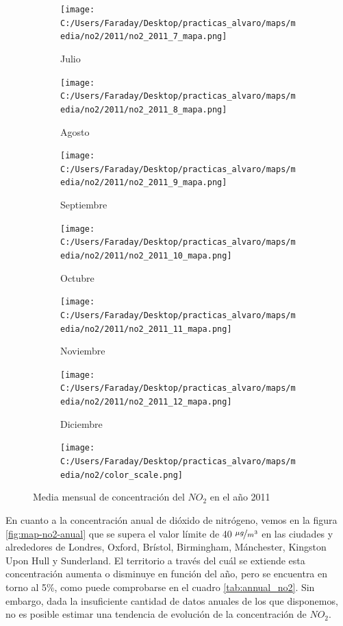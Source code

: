 \documentclass[12pt]{article}
\begin{document}
\begin{figure}[H]
\begin{subfigure}[H]{0.15\textwidth}
\texttt{[image: C:/Users/Faraday/Desktop/practicas\_alvaro/maps/media/no2/2011/no2\_2011\_7\_mapa.png]}
\captionsetup{labelformat=empty}
\caption{Julio}
\label{fig:map-no2-2011-7}
\end{subfigure}
%
\begin{subfigure}[H]{0.15\textwidth}
\texttt{[image: C:/Users/Faraday/Desktop/practicas\_alvaro/maps/media/no2/2011/no2\_2011\_8\_mapa.png]}
\captionsetup{labelformat=empty}
\caption{Agosto}
\label{fig:map-no2-2011-8}
\end{subfigure}
%
\begin{subfigure}[H]{0.15\textwidth}
\texttt{[image: C:/Users/Faraday/Desktop/practicas\_alvaro/maps/media/no2/2011/no2\_2011\_9\_mapa.png]}
\captionsetup{labelformat=empty}
\caption{Septiembre}
\label{fig:map-no2-2011-9}
\end{subfigure}
%
\begin{subfigure}[H]{0.15\textwidth}
\texttt{[image: C:/Users/Faraday/Desktop/practicas\_alvaro/maps/media/no2/2011/no2\_2011\_10\_mapa.png]}
\captionsetup{labelformat=empty}
\caption{Octubre}
\label{fig:map-no2-2011-10}
\end{subfigure}
%
\begin{subfigure}[H]{0.15\textwidth}
\texttt{[image: C:/Users/Faraday/Desktop/practicas\_alvaro/maps/media/no2/2011/no2\_2011\_11\_mapa.png]}
\captionsetup{labelformat=empty}
\caption{Noviembre}
\label{fig:map-no2-2011-11}
\end{subfigure}
%
\begin{subfigure}[H]{0.15\textwidth}
\texttt{[image: C:/Users/Faraday/Desktop/practicas\_alvaro/maps/media/no2/2011/no2\_2011\_12\_mapa.png]}
\captionsetup{labelformat=empty}
\caption{Diciembre}
\label{fig:map-no2-2011-12}
\end{subfigure}

\begin{subfigure}[H]{0.45\textwidth}
\texttt{[image: C:/Users/Faraday/Desktop/practicas\_alvaro/maps/media/no2/color\_scale.png]}
\captionsetup{labelformat=empty}
\caption{}
\end{subfigure}

\vspace*{-7mm}
\caption{Media mensual de concentración del $NO_{2}$ en el año 2011}
\label{fig:map-no2-2011}
\end{figure}

En cuanto a la concentración anual de dióxido de nitrógeno, vemos en la figura \ref{fig:map-no2-anual} que se supera el valor límite de 40 $\nicefrac{\mu g}{m^3}$ en las ciudades y alrededores de Londres, Oxford, Brístol, Birmingham, Mánchester, Kingston Upon Hull y Sunderland. El territorio a través del cuál se extiende esta concentración aumenta o disminuye en función del año, pero se encuentra en torno al 5\%, como puede comprobarse en el cuadro \ref{tab:annual_no2}. Sin embargo, dada la insuficiente cantidad de datos anuales de los que disponemos, no es posible estimar una tendencia de evolución de la concentración de $NO_{2}$.
\end{document}
